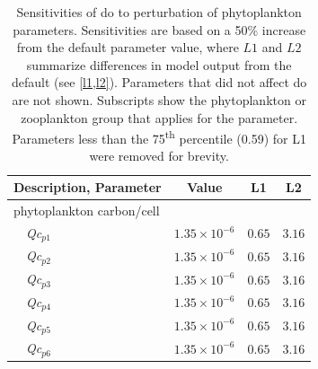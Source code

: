 \documentclass[letterpaper,12pt,oneside]{article}\usepackage[]{graphicx}\usepackage[]{color}
\begin{document}
\begin{table}[!tbp]
{\normalsize
\caption{Sensitivities of \ac{do} to perturbation of phytoplankton parameters.  Sensitivities are based on a 50\% increase from the default parameter value, where $L1$ and $L2$ summarize differences in model output from the default (see \cref{l1,l2}).  Parameters that did not affect \ac{do} are not shown.  Subscripts show the phytoplankton or zooplankton group that applies for the parameter. Parameters less than the 75\textsuperscript{th} percentile (0.59) for L1 were removed for brevity.\label{tab:phytosens}} 
\begin{center}
\begin{tabular}{llll}
\hline\hline
\multicolumn{1}{l}{Description, Parameter}&\multicolumn{1}{c}{Value}&\multicolumn{1}{c}{L1}&\multicolumn{1}{c}{L2}\tabularnewline
\hline
{phytoplankton carbon/cell}&&&\tabularnewline
~~\textit{Qc$_{p1}$}&$1.35\times 10^{-6}$&$0.65$&$3.16$\tabularnewline
~~\textit{Qc$_{p2}$}&$1.35\times 10^{-6}$&$0.65$&$3.16$\tabularnewline
~~\textit{Qc$_{p3}$}&$1.35\times 10^{-6}$&$0.65$&$3.16$\tabularnewline
~~\textit{Qc$_{p4}$}&$1.35\times 10^{-6}$&$0.65$&$3.16$\tabularnewline
~~\textit{Qc$_{p5}$}&$1.35\times 10^{-6}$&$0.65$&$3.16$\tabularnewline
~~\textit{Qc$_{p6}$}&$1.35\times 10^{-6}$&$0.65$&$3.16$\tabularnewline
\hline
\end{tabular}\end{center}}

\end{table}
\end{document}
